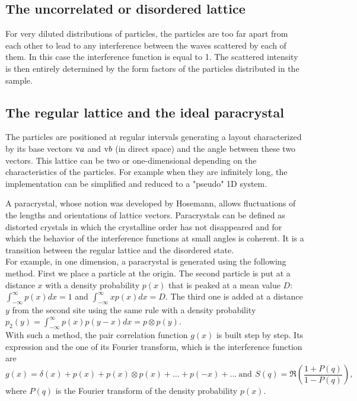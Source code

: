 \subsection{The uncorrelated or disordered lattice}
For very diluted distributions of particles, the particles are too far apart from each other to lead to any interference between the waves scattered by each of them. In this case the interference function is equal to 1. The scattered intensity is then entirely determined by the form factors of the particles distributed in the sample.

\subsection{The regular lattice and the ideal paracrystal}
The particles are positioned at regular intervals generating a layout characterized by its base vectors $\text{v}{a}$ and $\text{v}{b}$ (in direct space) and the angle between these two vectors.
This lattice can be two or one-dimensional depending on the characteristics of the particles. For example when they are infinitely long, the implementation can be simplified and reduced to a "pseudo" 1D system.

A paracrystal, whose notion was developed by Hosemann\cite{Hos51}, allows fluctuations of the lengths and orientations of lattice vectors. Paracrystals can be defined as distorted crystals in which the crystalline order has not disappeared and for which the behavior of the interference functions  at small angles is coherent.
It is a transition between the regular lattice and the disordered state.\\

For example, in one dimension, a paracrystal is generated using the following method. First we place a particle at the origin. The second particle is put at a distance $x$ with a density probability $p(x)$ that is peaked at a mean value $D$: $\int_{-\infty} ^{\infty}p(x)dx=1$ and $\int_{-\infty}^{\infty}xp(x)dx=D$. The third one is added at a distance $y$ from the second site using the same rule with a density probability $p_2(y)= \int_{-\infty}^{\infty}p(x)p(y-x)dx=p\otimes p(y)$.\\ With such a method, the pair correlation function $g(x)$ is built step by step. Its expression and the one of its Fourier transform, which is the interference function are
\begin{equation*}
g(x)=\delta(x)+ p(x)+ p(x)\otimes p(x)+\ldots + p(-x)+\ldots \: \mathrm{and}\:\, S(q)=\Re\left(\dfrac{1+P(q)}{1-P(q)}\right),
\end{equation*}
 where $P(q)$ is the Fourier transform of the density probability $p(x)$.\\

